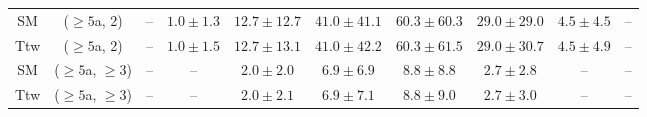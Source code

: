\begin{table}[h!]
{\begin{tabular}{cccccccccc}
	SM & ($\ge5$a, 2) & -- & $1.0\pm 1.3$ & $12.7\pm 12.7$ & $41.0\pm 41.1$ & $60.3\pm 60.3$ & $29.0\pm 29.0$ & $4.5\pm 4.5$ & -- \\[0.5ex] 
	Ttw & ($\ge5$a, 2) & -- & $1.0\pm 1.5$ & $12.7\pm 13.1$ & $41.0\pm 42.2$ & $60.3\pm 61.5$ & $29.0\pm 30.7$ & $4.5\pm 4.9$ & -- \\[0.5ex] 
	SM & ($\ge5$a, $\ge3$) & -- & -- & $2.0\pm 2.0$ & $6.9\pm 6.9$ & $8.8\pm 8.8$ & $2.7\pm 2.8$ & -- & -- \\[0.5ex] 
	Ttw & ($\ge5$a, $\ge3$) & -- & -- & $2.0\pm 2.1$ & $6.9\pm 7.1$ & $8.8\pm 9.0$ & $2.7\pm 3.0$ & -- & -- \\[0.5ex] 
	\hline
	\hline
\end{tabular}}
\end{table}
